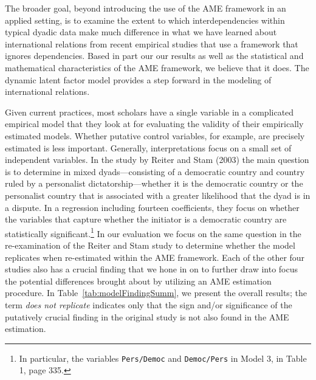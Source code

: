 The broader goal, beyond introducing the use of the AME framework in an applied setting, is to examine the extent to which interdependencies within typical dyadic data make much difference in what we have learned about international relations from recent empirical studies that use a framework that ignores dependencies.  Based in part our our results as well as the statistical and mathematical characteristics of the
AME framework, we believe that it does. The dynamic latent factor model provides a step forward in the modeling of international relations.

Given current practices, most scholars have a single variable in a complicated empirical model that they look at for evaluating the validity of their empirically estimated models.  Whether putative control variables, for example, are precisely estimated is less important. Generally, interpretations focus on a small set of independent variables.  In the study by Reiter and Stam (2003) the main question is to determine in mixed dyads---consisting of a democratic country and country ruled by a personalist dictatorship---whether it is the
democratic country or the personalist country that is associated with a greater likelihood that the dyad is in a dispute.  In a regression including fourteen coefficients, they focus on whether the variables that capture whether the initiator is a democratic country are statistically significant.\footnote{In particular, the variables \texttt{Pers/Democ} and \texttt{Democ/Pers} in Model 3, in Table 1, page 335.} In our evaluation we focus on the same question in the re-examination of the Reiter and Stam study to determine whether the model replicates when re-estimated within the AME framework. Each of the other four studies also has a crucial finding that we hone in on to further draw into focus the potential differences brought about by utilizing an AME estimation procedure.  In Table~\ref{tab:modelFindingSumm}, we present the overall results; the term \textit{does not replicate} indicates only that the sign and/or significance of the putatively crucial finding in the original study is not also found in the AME estimation.

